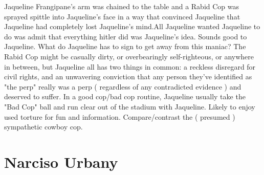 \documentclass[12pt]{book}
\begin{document}
Jaqueline Frangipane's arm was chained to the table and a Rabid Cop was sprayed spittle into Jaqueline's face in a way that convinced Jaqueline that Jaqueline had completely lost Jaqueline's mind.All Jaqueline wanted Jaqueline to do was admit that everything hitler did was Jaqueline's idea. Sounds good to Jaqueline. What do Jaqueline has to sign to get away from this maniac? The Rabid Cop might be casually dirty, or overbearingly self-righteous, or anywhere in between, but Jaqueline all has two things in common: a reckless disregard for civil rights, and an unwavering conviction that any person they've identified as "the perp" really was a perp ( regardless of any contradicted evidence ) and deserved to suffer. In a good cop/bad cop routine, Jaqueline usually take the "Bad Cop" ball and run clear out of the stadium with Jaqueline. Likely to enjoy used torture for fun and information. Compare/contrast the ( presumed ) sympathetic cowboy cop.



\chapter{Narciso Urbany}
\end{document}
